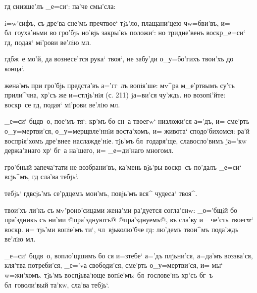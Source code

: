 
  гд   снизше'лъ 
_е=си`:     па'че смы'сла:


 i=w'сифъ, съ дре'ва сне'мъ 
преч твое` тjь'ло, плащани'цею ч w=бви'въ, и= 
бл~гоуха'ньми во гро'бjь но'вjь закры'въ положи`: но 
тридне'венъ воскр _е=си` гд, подая` мi'рови ве'лiю 
мл.

 гд бж~е мо'й, да вознесе'тся рука` 
твоя`, не забу'ди о_у=бо'гихъ твои'хъ до конца`.

 жена'мъ при гро'бjь предста'въ 
а='гг~лъ вопiя'ше: мv^ра м_е'ртвымъ су'ть прили^чна, 
хр'съ же и=стлjь'нiя (с. 211) jа=ви'ся чу'ждь. но 
возопi'йте: воскр~се гд, подая` мi'рови ве'лiю мл.

     
_е=си` бц дв~о, пое'мъ тя`: кр'мъ бо сн~а твоегw` 
низложи'ся а='дъ, и= сме'рть о_у=мертви'ся, 
о_у=мерщвле'ннiи воста'хомъ, и= живота` сподо'бихомся: 
ра'й воспрiя'хомъ дре'внее наслажде'нiе. тjь'мъ 
бл~годаря'ще, славосло'вимъ jа='кw держа'внаго хр` 
бг~а на'шего, и= _е=ди'наго многомл.


 гро'бный запеча'тати не возбрани'въ, 
ка'мень вjь'ры воскр~съ по'далъ _е=си` всjь^мъ, гд 
сла'ва тебjь`.

  тебjь` гд всjь'мъ 
се'рдцемъ мои'мъ, повjь'мъ вся^ чудеса` твоя^.

 твои'хъ ли'къ съ мv"роно'сицами 
жена'ми ра'дуется согла'снw: _о='бщiй бо пра'здникъ съ 
ни'ми @пра'зднуютъ@ {@пра'зднуемъ@}, въ сла'ву и= че'сть 
твоегw` воскр. и= тjь'ми вопiе'мъ ти`, 
чл~вjьколю'бче гд: лю'демъ твои^мъ пода'ждь ве'лiю 
мл.

     _е=си` бц дв~о, вопло'щшимъ бо ся 
и=з\ъ тебе` а='дъ плjьни'ся, а=да'мъ воззва'ся, кля'тва 
потреби'ся, _е='vа свободи'ся, сме'рть о_у=мертви'ся, и= 
мы` w=жи'хомъ. тjь'мъ воспjьва'юще вопiе'мъ: 
бл~гослове'нъ хр'съ бг~ъ бл~говоли'вый та'кw, сла'ва 
тебjь`.

